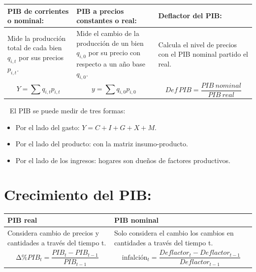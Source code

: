 \documentclass[
  letterpaper,
  DIV=11,
  numbers=noendperiod]{scrreport}
\providecommand{\tightlist}{%
  \setlength{\itemsep}{0pt}\setlength{\parskip}{0pt}}\usepackage{longtable,booktabs,array}
\begin{document}
\begin{table}[h]
    \centering
    \begin{tabular}{|p{40mm}|p{40mm}|p{50mm}|}
        \hline
        PIB de corrientes o nominal: & PIB a precios constantes o real: & Deflactor del PIB: \\ \hline
        Mide la producción total de cada bien $q_{i,t}$ por sus precios $p_{i,t}$. & Mide el cambio de la producción de un bien $q_{i,0}$ por su precio con respecto a un año base $q_{i,0}$.  & Calcula el nivel de precios con el PIB nominal partido el real. \\ \hline
        \[Y=\sum{q_{i,t}p_{i,t}}\] & \[y=\sum{q_{i,0}p_{i,0}}\] & \[Def \, PIB =\frac{PIB\ nominal}{PIB\ real}\] \\ \hline
    \end{tabular}
    
\end{table}

~ El PIB se puede medir de tres formas:

\begin{itemize}
\tightlist
\item
  Por el lado del gasto: \(Y=C+I+G+X+M\).
\item
  Por el lado del producto: con la matriz insumo-producto.
\item
  Por el lado de los ingresos: hogares son dueños de factores
  productivos.
\end{itemize}

\hypertarget{crecimiento-del-pib}{%
\section{Crecimiento del PIB:}\label{crecimiento-del-pib}}

\begin{table}[h]
    \centering
    \begin{tabular}{|p{55mm}|p{75mm}|}
        \hline
        PIB real & PIB nominal \\ \hline
        Considera cambio de precios y cantidades a través del tiempo t. & Solo considera el cambio los cambios en cantidades a través del tiempo t. \\ \hline
        \[\mathrm{\Delta}\%{PIB}_t=\frac{{PIB}_t-{PIB}_{t-1}}{{PIB}_{t-1}}\] & \[\textrm{infalción}_t=\frac{Deflactor_t-Deflactor_{t-1}}{Deflactor_{t-1}}\]  \\ \hline
    \end{tabular}
    
\end{table}
\end{document}

